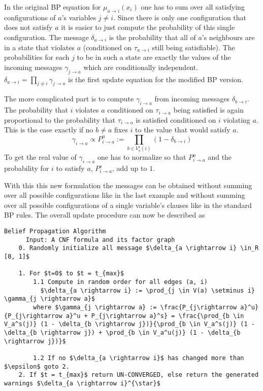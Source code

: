 In the original BP equation for $\mu_{a \rightarrow i}(x_i)$ one has to sum over all satisfying configurations of $a$'s variables $j \neq i$. Since there is only one configuration that does not satisfy $a$ it is easier to just compute the probability of this single configuration. The message $\delta_{a \rightarrow i}$ is the probability that all of $a$'s neighbours are in a state that violates $a$ (conditioned on $\tau_{a \rightarrow i}$ still being satisfiable). The probabilities for each $j$ to be in such a state are exactly the values of the incoming messages $\gamma_{j \rightarrow a}$ which are conditionally independent.
$\delta_{a \rightarrow i} = \prod_{j \neq i} \gamma_{j \rightarrow a}$ is the first update equation for the modified BP version.

The more complicated part is to compute $\gamma_{i \rightarrow a}$ from incoming messages $\delta_{b \rightarrow i}$. The probability that $i$ violates $a$ conditioned on $\tau_{i \rightarrow a}$ being satisfied is again proportional to the probability  that $\tau_{i \rightarrow a}$ is satisfied conditioned on $i$ violating $a$. This is the case exactly if no $b \neq a$ fixes $i$ to the value that would satisfy $a$.
$$\gamma_{i \rightarrow a} \propto P_{i \rightarrow a}^u := \prod_{b \in V_a^s(i)} (1 - \delta_{b \rightarrow i})$$
To get the real value of $\gamma_{i \rightarrow a}$ one has to normalize so that $P_{i \rightarrow a}^u$ and the probability for $i$ to satisfy $a$, $P_{i \rightarrow a}^s$, add up to $1$. \newline

With this this new formulation the messages can be obtained without summing over all possible configurations like in the last example and without summing over all possible configurations of a single variable's clauses like in the standard BP rules. \newline
The overall update procedure can now be described as

\begin{lstlisting}[mathescape=true, frame = single]
	Belief Propagation Algorithm
	  Input: A CNF formula and its factor graph
	0. Randomly initialize all message $\delta_{a \rightarrow i} \in_R [0, 1]$
	
	1. For $t=0$ to $t = t_{max}$
		1.1 Compute in random order for all edges (a, i)
		  $\delta_{a \rightarrow i} := \prod_{j \in V(a) \setminus i} \gamma_{j \rightarrow a}$		 
		where $\gamma_{j \rightarrow a} := \frac{P_{j\rightarrow a}^u}{P_{j\rightarrow a}^u + P_{j\rightarrow a}^s} = \frac{\prod_{b \in V_a^s(j)} (1 - \delta_{b \rightarrow j})}{\prod_{b \in V_a^s(j)} (1 - \delta_{b \rightarrow j}) + \prod_{b \in V_a^u(j)} (1 - \delta_{b \rightarrow j})}$
		 		
		1.2 If no $\delta_{a \rightarrow i}$ has changed more than $\epsilon$ goto 2.
	2. If $t = t_{max}$ return UN-CONVERGED, else return the generated warnings $\delta_{a \rightarrow i}^{\star}$
\end{lstlisting}

